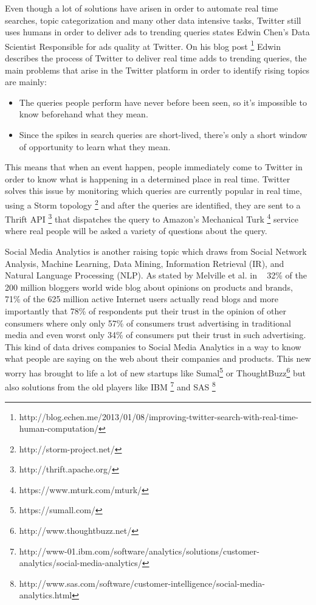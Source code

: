 Even though a lot of solutions have arisen in order to automate real time searches, topic categorization and many other data intensive tasks, Twitter still uses humans in order to deliver ads to trending queries states Edwin Chen's Data Scientist Responsible for ads quality at Twitter. On his blog post \footnote{http://blog.echen.me/2013/01/08/improving-twitter-search-with-real-time-human-computation/} Edwin describes the process of Twitter to deliver real time adds to trending queries, the main problems that arise in the Twitter platform in order to identify rising topics are mainly:
\begin{itemize}
  \item The queries people perform have never before been seen, so it's impossible to know beforehand what they mean.
  \item Since the spikes in search queries are short-lived, there's only a short window of opportunity to learn what they mean.
\end{itemize}
This means that when an event happen, people immediately come to Twitter in order to know what is happening in a determined place in real time. Twitter solves this issue by monitoring which queries are currently popular in real time, using a Storm topology \footnote{http://storm-project.net/} and after the queries are identified, they are sent to a Thrift API \footnote{http://thrift.apache.org/} that dispatches the query to Amazon's Mechanical Turk \footnote{https://www.mturk.com/mturk/} service where real people will be asked a variety of questions about the query.

Social Media Analytics is another raising topic which draws from Social Network Analysis, Machine Learning, Data Mining, Information Retrieval (IR), and Natural Language Processing (NLP). As stated by Melville et al. in ~\cite{Melville2009} 32\% of the 200 million bloggers world wide blog about opinions on products and brands, 71\% of the 625 million active Internet users actually read blogs and more importantly that 78\% of respondents put their trust in the opinion of other consumers where only only 57\% of consumers trust advertising in traditional media and even worst only 34\% of consumers put their trust in such advertising. This kind of data drives companies to Social Media Analytics in a way to know what people are saying on the web about their companies and products. This new worry has brought to life a lot of new startups like Sumal\footnote{https://sumall.com/} or ThoughtBuzz\footnote{http://www.thoughtbuzz.net/} but also solutions from the old players like IBM \footnote{http://www-01.ibm.com/software/analytics/solutions/customer-analytics/social-media-analytics/} and SAS \footnote{http://www.sas.com/software/customer-intelligence/social-media-analytics.html}

